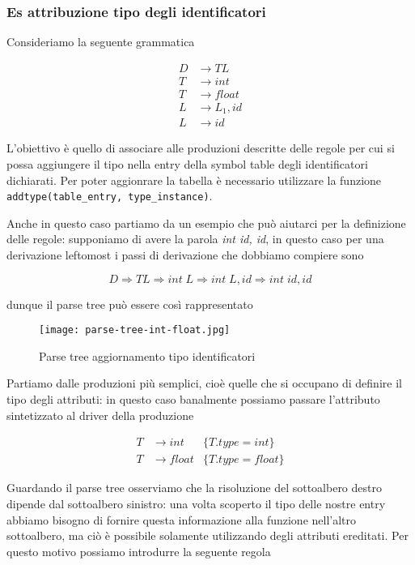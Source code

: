 \documentclass[class=book, crop=false, oneside, 12pt]{standalone}
\begin{document}
\subsubsection{Es attribuzione tipo degli identificatori}

Consideriamo la seguente grammatica

\begin{align*}
    D &\to TL \\
    T &\to int \\
    T &\to float \\
    L &\to L_1, id \\
    L &\to id
\end{align*}

L'obiettivo è quello di associare alle produzioni descritte delle regole per cui si possa aggiungere il tipo nella entry della symbol table degli identificatori dichiarati. Per poter aggionrare la tabella è necessario utilizzare la funzione \texttt{addtype(table\_entry, type\_instance)}.

Anche in questo caso partiamo da un esempio che può aiutarci per la definizione delle regole: supponiamo di avere la parola \emph{int id, id}, in questo caso per una derivazione leftomost i passi di derivazione che dobbiamo compiere sono

\begin{equation*}
    D \Rightarrow TL \Rightarrow int\; L \Rightarrow int\; L, id \Rightarrow int\; id, id
\end{equation*}

dunque il parse tree può essere così rappresentato

\begin{figure}[H]
	\centering
    \texttt{[image: parse-tree-int-float.jpg]}
    \caption{Parse tree aggiornamento tipo identificatori}
    \label{fig:parse-tree-int-float}
\end{figure}

Partiamo dalle produzioni più semplici, cioè quelle che si occupano di definire il tipo degli attributi: in questo caso banalmente possiamo passare l'attributo sintetizzato al driver della produzione

\begin{align*}
    T &\to int &\{T.type = int\} \\
    T &\to float &\{T.type = float\}
\end{align*}

Guardando il parse tree osserviamo che la risoluzione del sottoalbero destro dipende dal sottoalbero sinistro: una volta scoperto il tipo delle nostre entry abbiamo bisogno di fornire questa informazione alla funzione nell'altro sottoalbero, ma ciò è possibile solamente utilizzando degli attributi ereditati. Per questo motivo possiamo introdurre la seguente regola
\end{document}
